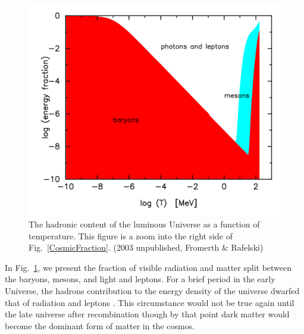 \documentclass[universe,article,submit,moreauthors,pdftex,a4paper]{Definitions/mdpi}
\newcommand*{\rf}[1]{Fig.~{\ref{#1}}}
\begin{document}
\begin{figure}[h]
\centering
\includegraphics[width=\linewidth]{hadron_content.png}
\caption{The hadronic content of the luminous Universe as a function of temperature. This figure is a zoom into the right side of \rf{CosmicFraction}. (2003 unpublished, Fromerth \& Rafelski) \cite{Rafelski:2019twp}}
\label{hadron_content}
\end{figure}

In \rf{hadron_content}, we present the fraction of visible radiation and matter split between the baryons, mesons, and light and leptons. For a brief period in the early Universe, the hadrons contribution to the energy density of the universe dwarfed that of radiation and leptons \cite{Rafelski:2019twp}. This circumstance would not be true again until the late universe after recombination though by that point dark matter would become the dominant form of matter in the cosmos.
\end{document}
